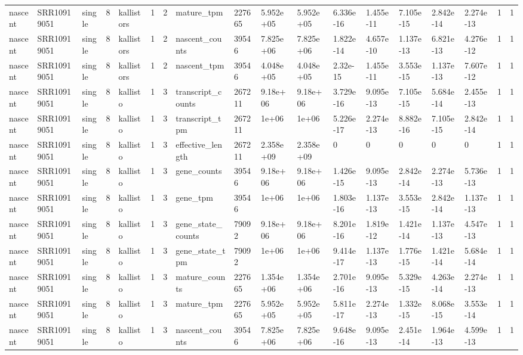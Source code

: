 \begin{tabular}{llllllllllllllllll}
nascent & SRR10919051 & single & 8 & kallistors & 1 & 2 & mature\_tpm & 227665 & 5.952e+05 & 5.952e+05 & 6.336e-16 & 1.455e-11 & 7.105e-15 & 2.842e-14 & 2.274e-13 & 1 & 1 \\
nascent & SRR10919051 & single & 8 & kallistors & 1 & 2 & nascent\_counts & 39546 & 7.825e+06 & 7.825e+06 & 1.822e-14 & 4.657e-10 & 1.137e-13 & 6.821e-13 & 4.276e-12 & 1 & 1 \\
nascent & SRR10919051 & single & 8 & kallistors & 1 & 2 & nascent\_tpm & 39546 & 4.048e+05 & 4.048e+05 & 2.32e-15 & 1.455e-11 & 3.553e-15 & 1.137e-13 & 7.607e-12 & 1 & 1 \\
nascent & SRR10919051 & single & 8 & kallisto & 1 & 3 & transcript\_counts & 267211 & 9.18e+06 & 9.18e+06 & 3.729e-16 & 9.095e-13 & 7.105e-15 & 5.684e-14 & 2.455e-13 & 1 & 1 \\
nascent & SRR10919051 & single & 8 & kallisto & 1 & 3 & transcript\_tpm & 267211 & 1e+06 & 1e+06 & 5.226e-17 & 2.274e-13 & 8.882e-16 & 7.105e-15 & 2.842e-14 & 1 & 1 \\
nascent & SRR10919051 & single & 8 & kallisto & 1 & 3 & effective\_length & 267211 & 2.358e+09 & 2.358e+09 & 0 & 0 & 0 & 0 & 0 & 1 & 1 \\
nascent & SRR10919051 & single & 8 & kallisto & 1 & 3 & gene\_counts & 39546 & 9.18e+06 & 9.18e+06 & 1.426e-15 & 9.095e-13 & 2.842e-14 & 2.274e-13 & 5.736e-13 & 1 & 1 \\
nascent & SRR10919051 & single & 8 & kallisto & 1 & 3 & gene\_tpm & 39546 & 1e+06 & 1e+06 & 1.803e-16 & 1.137e-13 & 3.553e-15 & 2.842e-14 & 1.137e-13 & 1 & 1 \\
nascent & SRR10919051 & single & 8 & kallisto & 1 & 3 & gene\_state\_counts & 79092 & 9.18e+06 & 9.18e+06 & 8.201e-16 & 1.819e-12 & 1.421e-14 & 1.137e-13 & 4.547e-13 & 1 & 1 \\
nascent & SRR10919051 & single & 8 & kallisto & 1 & 3 & gene\_state\_tpm & 79092 & 1e+06 & 1e+06 & 9.414e-17 & 1.137e-13 & 1.776e-15 & 1.421e-14 & 5.684e-14 & 1 & 1 \\
nascent & SRR10919051 & single & 8 & kallisto & 1 & 3 & mature\_counts & 227665 & 1.354e+06 & 1.354e+06 & 2.701e-16 & 9.095e-13 & 5.329e-15 & 4.263e-14 & 2.274e-13 & 1 & 1 \\
nascent & SRR10919051 & single & 8 & kallisto & 1 & 3 & mature\_tpm & 227665 & 5.952e+05 & 5.952e+05 & 5.811e-17 & 2.274e-13 & 1.332e-15 & 8.068e-15 & 3.553e-14 & 1 & 1 \\
nascent & SRR10919051 & single & 8 & kallisto & 1 & 3 & nascent\_counts & 39546 & 7.825e+06 & 7.825e+06 & 9.648e-16 & 9.095e-13 & 2.451e-14 & 1.964e-13 & 4.599e-13 & 1 & 1 \\

\end{tabular}
